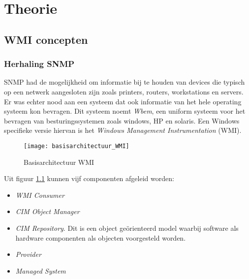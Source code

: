 \documentclass{report}
\begin{document}

	\tableofcontents

	\part{Theorie}
	\chapter{WMI concepten}
	\section{Herhaling SNMP}
	SNMP had de mogelijkheid om informatie bij te houden van devices die typisch op een netwerk aangesloten zijn zoals printers, routers, workstations en servers. Er was echter nood aan een systeem dat ook informatie van het hele operating systeem kon bevragen.
	Dit systeem noemt \textit{Wbem}, een uniform systeem voor het bevragen van besturingssystemen zoals windows, HP en solaris. Een Windows specifieke versie hiervan is het \textit{Windows Management Instrumentation} (WMI).
	\begin{figure}
		\texttt{[image: basisarchitectuur\_WMI]}
		\caption{Basisarchitectuur WMI}
		\label{fig:basisarchitectuur_WMI}
	\end{figure}
	Uit figuur \ref{fig:basisarchitectuur_WMI} kunnen vijf componenten afgeleid worden:
	\begin{itemize}
		\item \textit{WMI Consumer}
		\item \textit{CIM Object Manager}
		\item \textit{CIM Repository}. Dit is een object geörienteerd model waarbij software als hardware componenten als objecten voorgesteld worden. 
		\item \textit{Provider}
		\item \textit{Managed System}
	\end{itemize}
\end{document}
